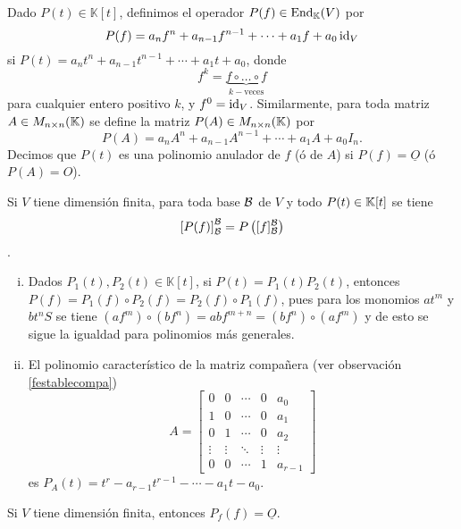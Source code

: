 \begin{defn}
Dado $P(t)\in \mathbb{K}[t]$, definimos el operador $P(f)\in\operatorname{End}_\mathbb{K}(V)$ por
\[
P(f)=a_nf^n+a_{n-1}f^{n-1}+\cdots+a_1f+a_0\operatorname{id}_V
\]
si $P(t)=a_nt^n+a_{n-1}t^{n-1}+\cdots+a_1t+a_0$, donde
\[
f^k=\underbrace{f\circ\ldots\circ f}_{k-\textrm{veces}}
\]
para cualquier entero positivo $k$, y $f^0=\operatorname{id}_V$. Similarmente, para toda matriz $A\in M_{n\times n}(\mathbb{K})$ se define la matriz $P(A)\in M_{n\times n}(\mathbb{K})$ por
\[
P(A)=a_nA^n+a_{n-1}A^{n-1}+\cdots+a_1A+a_0I_n.
\]
Decimos que $P(t)$ es una polinomio anulador de $f$ (ó de $A$) si $P(f)=\underline{O}$ (ó $P(A)=O$).
\end{defn}

\begin{obs}
  Si $V$ tiene dimensión finita, para toda base $\mathcal{B}$ de $V$ y todo $P(t)\in\mathbb{K}[t]$ se tiene
  $$\left[P(f)\right]_{\mathcal{B}}^{\mathcal{B}}=P\left([f]_{\mathcal{B}}^{\mathcal{B}}\right)$$.
\end{obs}

\begin{obs}\label{observacionesparacayleyhamilton}
  \begin{enumerate}[(i)]
  \item Dados $P_1(t),P_2(t)\in \mathbb{K}[t]$, si $P(t)=P_1(t)P_2(t)$, entonces $P(f)=P_1(f)\circ P_2(f)=P_2(f)\circ P_1(f)$, pues para los monomios $at^m$ y $bt^nS$ se tiene $\left(af^m\right)\circ\left( bf^n\right)=abf^{m+n}=\left( bf^n\right)\circ \left(af^m\right)$ y de esto se sigue la igualdad para polinomios más generales.
  \item El polinomio característico de la matriz compañera (ver observación \ref{festablecompa})
  $$
  A=\left[\begin{array}{ccccc}
    0 & 0 & \cdots & 0 & a_0\\
    1 & 0 & \cdots & 0 & a_1\\
    0 & 1 & \cdots & 0 & a_2\\
    \vdots & \vdots & \ddots & \vdots & \vdots\\
    0 & 0 & \cdots & 1 & a_{r-1}
  \end{array}\right]
  $$
  es $P_A(t)=t^r-a_{r-1}t^{r-1}-\cdots-a_1t-a_0$.
\end{enumerate}
\end{obs}

\begin{teo}\label{cayleyhamilton}
  Si $V$ tiene dimensi\'on finita, entonces $P_f(f)=\underline{O}$.
\end{teo}

